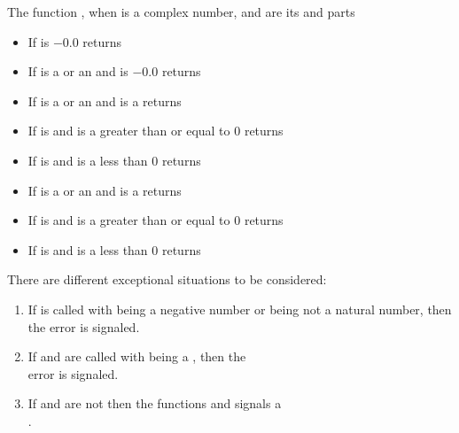 \documentclass[../Comparisons-Predicates.tex]{subfiles}
\begin{document}
\noindent
The function , when  is a complex number, 
and  are its  and  parts
\begin{itemize}
\item If  is $-0.0$ returns 
  \code{))}
\item If  is a  or an
   and
   is
  $-0.0$ returns 
\item If  is a  or an
   and
   is a
   returns\\
\item If  is  and
   is a greater than or equal to $0$ returns\\
\item If  is  and
   is a less than $0$ returns 
\item If  is a  or an
   and
   is a
   returns\\
\item If  is  and
   is a greater than or equal to $0$ returns\\
\item If  is  and
   is a less than $0$ returns 
\end{itemize}


\DExceptional{}

There are different exceptional situations to be considered:
\begin{enumerate}
\item If  is called with  being a negative
  number or being not a natural number, then the
   error
  is signaled.
\item If  and  are called with
   being a , then the\\
   error is signaled.
\item If  and  are not \CL{}
   then the functions  and 
  signals a\\
  .
\end{enumerate}
\end{document}

